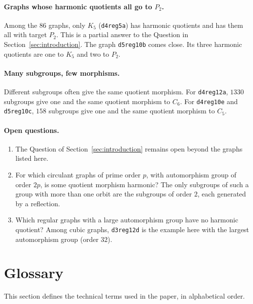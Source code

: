 \documentclass[12pt,letterpaper]{article}
\theoremstyle{definition}
\begin{document}
\paragraph{Graphs whose harmonic quotients all go to $P_2$.}
Among the $86$ graphs, only $K_5$ ({\tt d4reg5a}) has harmonic quotients
and has them all with target $P_2$. This is a partial answer to the
Question in Section~\ref{sec:introduction}. The graph {\tt d5reg10b} comes
close. Its three harmonic quotients are one to $K_5$ and two to $P_2$.

\paragraph{Many subgroups, few morphisms.}
Different subgroups often give the same quotient morphism. For
{\tt d4reg12a}, $1330$ subgroups give one and the same quotient morphism to
$C_6$. For {\tt d4reg10e} and {\tt d5reg10c}, $158$ subgroups give one and
the same quotient morphism to $C_5$.

\paragraph{Open questions.}
\begin{enumerate}
\item The Question of Section~\ref{sec:introduction} remains open beyond
the graphs listed here.
\item For which circulant graphs of prime order $p$, with automorphism group
of order $2p$, is some quotient morphism harmonic? The only subgroups of
such a group with more than one orbit are the subgroups of order $2$, each generated by a reflection.
\item Which regular graphs with a large automorphism group have no
harmonic quotient? Among cubic graphs, {\tt d3reg12d} is the example here
with the largest automorphism group (order $32$).
\end{enumerate}

\section{Glossary}
\label{sec:glossary}

This section defines the technical terms used in the paper, in
alphabetical order.
\end{document}
